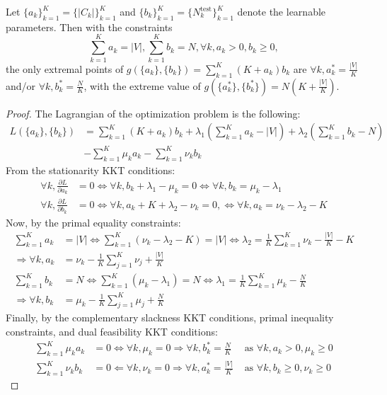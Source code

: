 \begin{lemma}
    \label{lemma:kkt_evaluation_cost}
    Let $\{a_k\}_{k=1}^{K}=\{|C_k|\}_{k=1}^{K}$ and $\{b_k\}_{k=1}^{K}=\{N_k^{\text{test}}\}_{k=1}^{K}$ denote the learnable parameters. Then with the constraints $$\sum_{k=1}^{K}{a_k}=|V|, \sum_{k=1}^{K}{b_k}=N, \forall k, a_k > 0, b_k \geq 0,$$ the only extremal points of $g(\{a_k\},\{b_k\})=\sum_{k=1}^{K}{(K + a_k)b_k}$ are $\forall k, a^*_k = \frac{|V|}{K}$ and/or $\forall k, b^*_k = \frac{N}{K}$, with the extreme value of $g(\{a^*_k\},\{b^*_k\})=N\left(K + \frac{|V|}{K}\right)$.
\end{lemma}
    \begin{proof}
        The Lagrangian of the optimization problem is the following:
        \begin{align*}
             L(\{a_k\},\{b_k\}) &= \sum_{k=1}^{K}{(K + a_k)b_k} + \lambda_1 \left(\sum_{k=1}^{K}{a_k} - |V|\right) + \lambda_2 \left(\sum_{k=1}^{K}{b_k} - N\right) \\
             &- \sum_{k=1}^{K}{\mu_k a_k} - \sum_{k=1}^{K}{\nu_k b_k}
        \end{align*}
        $$$$
    From the stationarity KKT conditions:
    \begin{align*}
        \forall k, \frac{\partial L}{\partial a_k} &= 0 \Leftrightarrow \forall k, b_k + \lambda_1 - \mu_k = 0 \Leftrightarrow  \forall k, b_k = \mu_k - \lambda_1 \\
        \forall k, \frac{\partial L}{\partial b_k} &= 0 \Leftrightarrow \forall k, a_k + K + \lambda_2 - \nu_k = 0, \Leftrightarrow \forall k, a_k = \nu_k - \lambda_2 - K
    \end{align*}
    Now, by the primal equality constraints:
    \begin{align*}
        \sum_{k=1}^{K}{a_k} &= |V| \Leftrightarrow \sum_{k=1}^{K}{(\nu_k - \lambda_2 - K)} = |V| \Leftrightarrow \lambda_2 = \frac{1}{K} \sum_{k=1}^{K}{\nu_k} - \frac{|V|}{K} - K \\
        \Rightarrow \forall k, a_k &= \nu_k - \frac{1}{K} \sum_{j=1}^{K}{\nu_j} + \frac{|V|}{K} \\
        \sum_{k=1}^{K}{b_k} &= N \Leftrightarrow \sum_{k=1}^{K}{(\mu_k - \lambda_1)} = N \Leftrightarrow \lambda_1 = \frac{1}{K} \sum_{k=1}^{K}{\mu_k} - \frac{N}{K} \\
        \Rightarrow \forall k, b_k &= \mu_k - \frac{1}{K} \sum_{j=1}^{K}{\mu_j} + \frac{N}{K}
    \end{align*}
    Finally, by the complementary slackness KKT conditions, primal inequality constraints, and dual feasibility KKT conditions:
    \begin{align*}
        \sum_{k=1}^{K}{\mu_k a_k} &= 0 \Leftrightarrow \forall k, \mu_k = 0 \Rightarrow \forall k, b^*_k=\frac{N}{K} & \text{ as $\forall k, a_k>0,\mu_k \geq 0$}\\
        \sum_{k=1}^{K}{\nu_k b_k} &= 0 \Leftarrow \forall k, \nu_k = 0 \Rightarrow \forall k, a^*_k = \frac{|V|}{K} & \text{ as $\forall k, b_k \geq 0,\nu_k \geq 0$}
    \end{align*}
    \end{proof}

